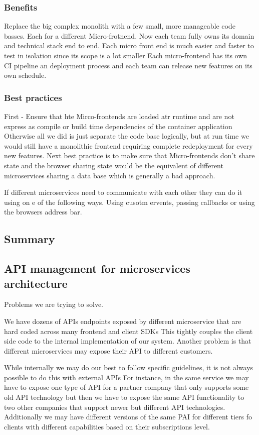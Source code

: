 \subsubsection{Benefits}
Replace the big complex monolith with a few small, more manageable code basses.
Each for a different Micro-frotnend.
Now each team fully owns its domain and technical stack end to end.
Each micro front end is much easier and faster to test in isolation since its scope is a lot smaller
Each micro-frontend has its own CI pipeline an deployment process and each team can release new features on its own schedule.

\subsubsection{Best practices}
First - Ensure that hte Mirco-frontends are loaded atr runtime and are not express as compile or build time dependencies of the container application
Otherwise all we did is just separate the code base logically, but at run time we would still have a monolithic frontend requiring complete redeployment for every new features.
Next best practice is to make sure that Micro-frontends don't share state and the browser sharing state would be the equivalent of different microservices sharing a data base which is generally a bad approach.

If different microservices need to communicate with each other they can do it using on e of the following ways. Using cusotm ervents, passing callbacks or using the browsers address bar.

\subsection{Summary}

\subsection{API management for microservices architecture}
Problems we are trying to solve.

We have dozens of APIs endpoints exposed by different microservice that are hard coded across many frontend and client SDKs
This tightly couples the client side code to the internal implementation of our system.
Another problem is that different microservices may expose their API to different customers.

While internally we may do our best to follow specific guidelines, it is not always possible to do this with external APIs
For instance, in the same service we may have to expose one type of API for a partner company that only supports some old API technology but then we have to expose the same API functionality to two other companies that support newer but different API technologies.
Additionally we may have different versions of the same PAI for different tiers fo clients with different capabilities based on their subscriptions level.

